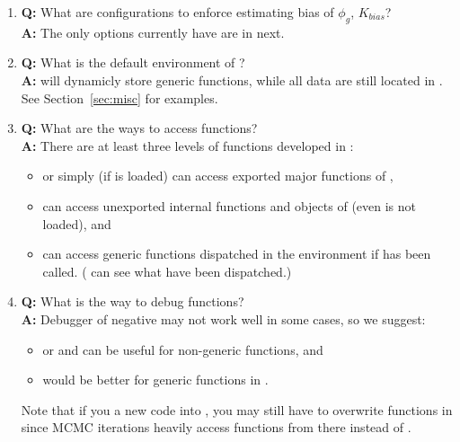 \begin{enumerate}
\item {\bf\color{blue} Q:}
      What are configurations to enforce estimating bias of $\phi_g$,
      $K_{bias}$? \\
      {\bf\color{blue} A:}
      The only options currently  have are in next.

\item {\bf\color{blue} Q:}
      What is the default environment of ? \\
      {\bf\color{blue} A:}
       will dynamicly store generic functions, while
      all data are still located in .
      See Section~\ref{sec:misc} for examples.

\item {\bf\color{blue} Q:}
      What are the ways to access  functions? \\
      {\bf\color{blue} A:}
      There are at least three levels of functions developed in :
      \begin{itemize}
        \item {} or simply 
              (if  is loaded) can access exported major functions
              of ,
        \item {}
              can access unexported internal functions and objects
              of  (even  is not loaded), and
        \item {}
              can access generic functions dispatched in the environment
               if  has been called.
              ( can see what have been dispatched.)
      \end{itemize}

\item {\bf\color{blue} Q:}
      What is the way to debug  functions? \\
      {\bf\color{blue} A:}
      Debugger of negative  may not work well in some cases, so we
      suggest:
      \begin{itemize}
        \item {} or  and 
              can be useful for non-generic functions, and
        \item {} would be better for generic functions
              in .
      \end{itemize}
      Note that if you  a new code into , you
      may still have to overwrite functions in  since
      MCMC iterations heavily access functions from there instead of
      .


\end{enumerate}
